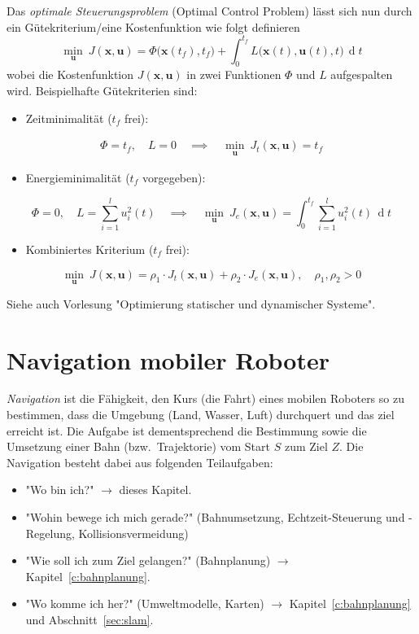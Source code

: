 \documentclass[a4paper, 11pt, accentcolor = tud3b]{tudreport}
\DeclareMathOperator{\total}{d}
\newcommand{\dif}[1]{\,\total#1}
\renewcommand{\vec}[1]{\boldsymbol{#1}}
\newcommand{\bzw}{bzw.~}
\begin{document}
				Das \emph{optimale Steuerungsproblem} (Optimal Control Problem) lässt sich nun durch ein Gütekriterium/eine Kostenfunktion wie folgt definieren
				\begin{equation*}
					\min_{\vec{u}} \> J(\vec{x}, \vec{u}) = \Phi\big(\vec{x}(t_f), t_f\big) + \int_{0}^{t_f} \! L\big(\vec{x}(t), \vec{u}(t), t\big) \dif{t}
				\end{equation*}
				wobei die Kostenfunktion \( J(\vec{x}, \vec{u}) \) in zwei Funktionen \( \Phi \) und \( L \) aufgespalten wird. Beispielhafte Gütekriterien sind:
				\begin{itemize}
					\item Zeitminimalität (\(t_f\) frei):
				\end{itemize}
				\begin{gather*}
					\Phi = t_f,\quad L = 0 \quad\implies\quad \min_{\vec{u}} \> J_t(\vec{x}, \vec{u}) = t_f
				\end{gather*}
				\begin{itemize}
					\item Energieminimalität (\(t_f\) vorgegeben):
				\end{itemize}
				\begin{equation*}
					\Phi = 0,\quad L = \sum_{i = 1}^{l} u_i^2 (t) \quad\implies\quad \min_{\vec{u}} \> J_e(\vec{x}, \vec{u}) = \int_{0}^{t_f} \! \sum_{i = 1}^{l} u_i^2 (t) \dif{t}
				\end{equation*}
				\begin{itemize}
					\item Kombiniertes Kriterium (\(t_f\) frei):
				\end{itemize}
				\begin{equation*}
					\min_{\vec{u}} \> J(\vec{x}, \vec{u}) = \rho_1 \cdot J_t(\vec{x}, \vec{u}) + \rho_2 \cdot J_e(\vec{x}, \vec{u}),\quad \rho_1, \rho_2 > 0
				\end{equation*}
				
				Siehe auch Vorlesung "Optimierung statischer und dynamischer Systeme".

	\chapter{Navigation mobiler Roboter}
		\emph{Navigation} ist die Fähigkeit, den Kurs (die Fahrt) eines mobilen Roboters so zu bestimmen, dass die Umgebung (Land, Wasser, Luft) durchquert und das ziel erreicht ist. Die Aufgabe ist dementsprechend die Bestimmung sowie die Umsetzung einer Bahn (\bzw Trajektorie) vom Start \(S\) zum Ziel \(Z\). Die Navigation besteht dabei aus folgenden Teilaufgaben:
		\begin{itemize}
			\item "Wo bin ich?" \(\to\) dieses Kapitel.
			\item "Wohin bewege ich mich gerade?" (Bahnumsetzung, Echtzeit-Steuerung und -Regelung, Kollisionsvermeidung)
			\item "Wie soll ich zum Ziel gelangen?" (Bahnplanung) \(\to\) Kapitel~\ref{c:bahnplanung}.
			\item "Wo komme ich her?" (Umweltmodelle, Karten) \(\to\) Kapitel~\ref{c:bahnplanung} und Abschnitt~\ref{sec:slam}.
		\end{itemize}
\end{document}
